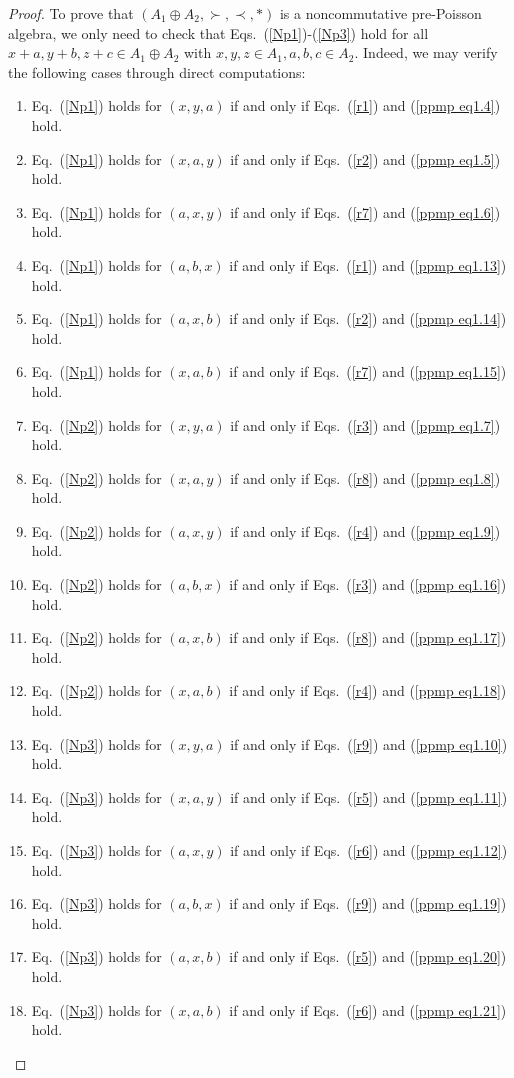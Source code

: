 \documentclass[12pt]{amsart}
\theoremstyle{definition}
\begin{document}
\begin{proof} To prove that $(A_1\oplus A_2,\succ,\prec,\ast)$ is a noncommutative pre-Poisson algebra,
		we only need to check that Eqs.~(\ref{Np1})-(\ref{Np3}) hold for 
all $x+a,y+b,z+c\in A_1\oplus A_2$ with $x,y,z\in A_1,a,b,c\in A_2$. 
Indeed, we may verify the following cases through direct computations:
\begin{enumerate}
\item Eq.~(\ref{Np1}) holds for $(x,y,a)$ if and only if Eqs.~(\ref {r1}) and (\ref {ppmp eq1.4}) hold.
\item Eq.~(\ref{Np1}) holds for $(x,a,y)$ if and only if Eqs.~(\ref {r2}) and (\ref {ppmp eq1.5}) hold.
\item Eq.~(\ref{Np1}) holds for $(a,x,y)$ if and only if Eqs.~(\ref {r7}) and (\ref {ppmp eq1.6}) hold.
\item Eq.~(\ref{Np1}) holds for $(a,b,x)$ if and only if Eqs.~(\ref {r1}) and (\ref {ppmp eq1.13}) hold.
\item Eq.~(\ref{Np1}) holds for $(a,x,b)$ if and only if Eqs.~(\ref {r2}) and (\ref {ppmp eq1.14}) hold.
\item Eq.~(\ref{Np1}) holds for $(x,a,b)$ if and only if Eqs.~(\ref {r7}) and (\ref {ppmp eq1.15}) hold.
\item Eq.~(\ref{Np2}) holds for $(x,y,a)$ if and only if Eqs.~(\ref {r3}) and (\ref {ppmp eq1.7}) hold.
\item Eq.~(\ref{Np2}) holds for $(x,a,y)$ if and only if Eqs.~(\ref {r8}) and (\ref {ppmp eq1.8}) hold.
\item Eq.~(\ref{Np2}) holds for $(a,x,y)$ if and only if Eqs.~(\ref {r4}) and (\ref {ppmp eq1.9}) hold.
\item Eq.~(\ref{Np2}) holds for $(a,b,x)$ if and only if Eqs.~(\ref {r3}) and (\ref {ppmp eq1.16}) hold.
\item Eq.~(\ref{Np2}) holds for $(a,x,b)$ if and only if Eqs.~(\ref {r8}) and (\ref {ppmp eq1.17}) hold.	
\item Eq.~(\ref{Np2}) holds for $(x,a,b)$ if and only if Eqs.~(\ref {r4}) and (\ref {ppmp eq1.18}) hold.
\item Eq.~(\ref{Np3}) holds for $(x,y,a)$ if and only if Eqs.~(\ref {r9}) and (\ref {ppmp eq1.10}) hold.
\item Eq.~(\ref{Np3}) holds for $(x,a,y)$ if and only if Eqs.~(\ref {r5}) and (\ref {ppmp eq1.11}) hold.
\item Eq.~(\ref{Np3}) holds for $(a,x,y)$ if and only if Eqs.~(\ref {r6}) and (\ref {ppmp eq1.12}) hold.
\item Eq.~(\ref{Np3}) holds for $(a,b,x)$ if and only if Eqs.~(\ref {r9}) and (\ref {ppmp eq1.19}) hold.
\item Eq.~(\ref{Np3}) holds for $(a,x,b)$ if and only if Eqs.~(\ref {r5}) and (\ref {ppmp eq1.20}) hold.	
\item Eq.~(\ref{Np3}) holds for $(x,a,b)$ if and only if Eqs.~(\ref {r6}) and (\ref {ppmp eq1.21}) hold.
\end{enumerate}
\end{proof}
\end{document}
